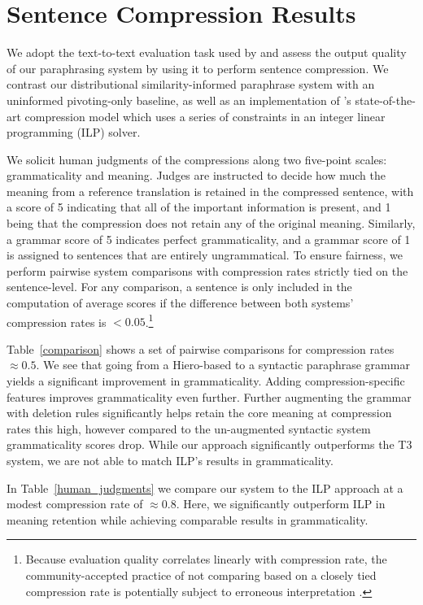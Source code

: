 \documentclass[11pt]{article}
\begin{document}
\section{Sentence Compression Results}
\label{sec-results}

We adopt the text-to-text evaluation task used by
 and assess the output quality of our
paraphrasing system by using it to perform sentence compression. We
contrast our distributional similarity-informed paraphrase system with
an uninformed pivoting-only baseline, as well as an implementation of
's state-of-the-art compression model which uses a
series of constraints in an integer linear programming (ILP) solver.


We solicit human judgments of the compressions along two five-point
scales: grammaticality and meaning. Judges are instructed to decide
how much the meaning from a reference translation is retained in the
compressed sentence, with a score of 5 indicating that all of the
important information is present, and 1 being that the compression
does not retain any of the original meaning. Similarly, a grammar
score of 5 indicates perfect grammaticality, and a grammar score of 1
is assigned to sentences that are entirely ungrammatical. To ensure
fairness, we perform pairwise system comparisons with compression
rates strictly tied on the sentence-level. For any comparison, a
sentence is only included in the computation of average scores if the
difference between both systems' compression rates is
$<0.05$.\footnote{Because evaluation quality correlates linearly with
  compression rate, the community-accepted practice of not comparing
  based on a closely tied compression rate is potentially subject to
  erroneous interpretation \cite{Napoles2011}.}

Table~\ref{comparison} shows a set of pairwise comparisons for
compression rates $\approx 0.5$. We see that going from a Hiero-based
to a syntactic paraphrase grammar yields a significant improvement in
grammaticality. Adding compression-specific features improves
grammaticality even further. Further augmenting the grammar with
deletion rules significantly helps retain the core meaning at
compression rates this high, however compared to the un-augmented
syntactic system grammaticality scores drop. While our approach
significantly outperforms the T3 system, we are not able to match
ILP's results in grammaticality.


In Table~\ref{human_judgments} we compare our system to the ILP
approach at a modest compression rate of $\approx 0.8$.  Here, we
significantly outperform ILP in meaning retention while achieving
comparable results in grammaticality.
\end{document}
